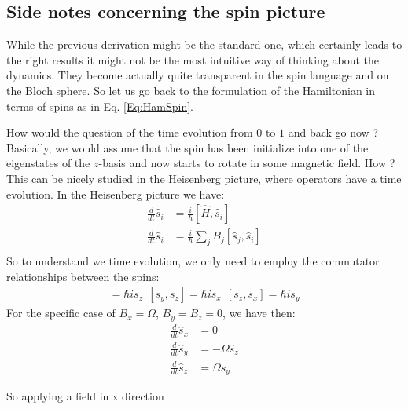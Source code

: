 \subsection{Side notes concerning the spin picture}

While the previous derivation might be the standard one, which certainly leads to the right results it might not be the most intuitive way of thinking about the dynamics. They become actually quite transparent in the spin language and on the Bloch sphere. So let us go back to the formulation of the Hamiltonian in terms of spins as in Eq. \eqref{Eq:HamSpin}.

How would the question of the time evolution from $0$ to $1$ and back go now ? Basically, we would assume that the spin has been initialize into one of the eigenstates of the $z$-basis and now starts to rotate in some magnetic field. How ? This can be nicely studied in the Heisenberg picture, where operators have a time evolution. In the Heisenberg picture we have:
\begin{align}
\frac{d}{dt} \hat{s}_i &= \frac{i}{\hbar}\left[\hat{H},\hat{s}_i\right]\\
\frac{d}{dt} \hat{s}_i &= \frac{i}{\hbar}\sum_j B_j \left[\hat{s}_j,\hat{s}_i\right]\\
 \end{align}
So to understand we time evolution, we only need to employ the commutator relationships between the spins:
\begin{align}
[ s_x, s_y] = \hbar is_z~~[ s_y, s_z] = \hbar is_x~~[ s_z, s_x] = \hbar is_y
\end{align}
For the specific case of $B_x=\Omega$, $B_y = B_z = 0$, we have then:
\begin{align}
\frac{d}{dt} \hat{s}_x &= 0\\
\frac{d}{dt} \hat{s}_y &= -\Omega \hat{s}_z\\
\frac{d}{dt} \hat{s}_z &= \Omega \hat{s}_y
 \end{align}
 
 So applying a field in x direction